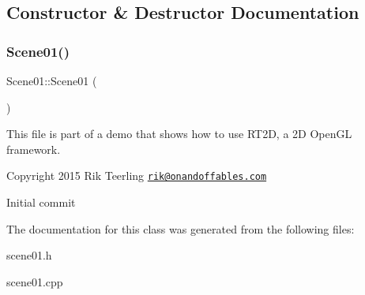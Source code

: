 \subsection{Constructor \& Destructor Documentation}
\mbox{\label{class_scene01_aa485d27ddea0a312ce76a36f18417b93}} 
\subsubsection{\texorpdfstring{Scene01()}{Scene01()}}
{\footnotesize\ttfamily Scene01\+::\+Scene01 (\begin{DoxyParamCaption}{ }\end{DoxyParamCaption})}

This file is part of a demo that shows how to use R\+T2D, a 2D Open\+GL framework.


\begin{DoxyItemize}
\item Copyright 2015 Rik Teerling \href{mailto:rik@onandoffables.com}{\tt rik@onandoffables.\+com}
\begin{DoxyItemize}
\item Initial commit 
\end{DoxyItemize}
\end{DoxyItemize}

The documentation for this class was generated from the following files\+:\begin{DoxyCompactItemize}
\item 
scene01.\+h\item 
scene01.\+cpp\end{DoxyCompactItemize}
